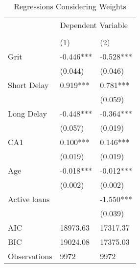 \begin{table}[h]
\centering
\caption{Regressions Considering Weights}
\label{tab:reg1}
\begin{tabular}{@{}lll@{}}
\toprule
             & \multicolumn{2}{l}{Dependent Variable} \\
             & \multicolumn{2}{l}{}                   \\ \midrule
             & (1)                & (2)               \\ \midrule
Grit         & -0.446***          & -0.528***         \\
             & (0.044)            & (0.046)           \\
Short Delay  & 0.919***           & 0.781***          \\
             &                    & (0.059)           \\
Long Delay   & -0.448***          & -0.364***         \\
             & (0.057)            & (0.019)           \\
CA1          & 0.100***           & 0.146***          \\
             & (0.019)            & (0.019)           \\
Age          & -0.018***          & -0.012***         \\
             & (0.002)            & (0.002)           \\
Active loans &                    & -1.550***         \\
             &                    & (0.039)           \\ \midrule
AIC          & 18973.63           & 17317.37          \\
BIC          & 19024.08           & 17375.03          \\
Observations & 9972               & 9972              \\ \bottomrule
\end{tabular}%
\end{table}